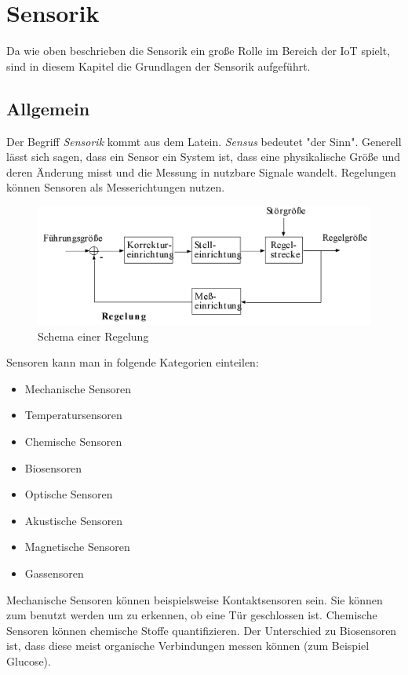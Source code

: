 \section{Sensorik}
Da wie oben beschrieben die Sensorik ein große Rolle im Bereich der IoT spielt, sind in diesem Kapitel die Grundlagen der Sensorik aufgeführt.  
\subsection{Allgemein}
Der Begriff \textit{Sensorik} kommt aus dem Latein. \textit{Sensus} bedeutet "der Sinn". Generell lässt sich sagen, dass ein Sensor ein System ist, dass eine physikalische Größe und deren Änderung misst und die Messung in nutzbare Signale wandelt. 
Regelungen können Sensoren als Messerichtungen nutzen.  

\begin{figure}
\includegraphics[scale=0.3
]{bilder/regelung} 
\caption{Schema einer Regelung \cite{Strand}}
\label{IPv4}
\end{figure}

Sensoren kann man in folgende Kategorien einteilen:
\begin{itemize}
\item Mechanische Sensoren
\item Temperatursensoren 
\item Chemische Sensoren
\item Biosensoren
\item Optische Sensoren 
\item Akustische Sensoren
\item Magnetische Sensoren 
\item Gassensoren
\end{itemize}

Mechanische Sensoren können beispielsweise Kontaktsensoren sein. Sie können zum benutzt werden um zu erkennen, ob eine Tür geschlossen ist. Chemische Sensoren können chemische Stoffe quantifizieren. Der Unterschied zu Biosensoren ist, dass diese meist organische Verbindungen messen können (zum Beispiel Glucose). 

